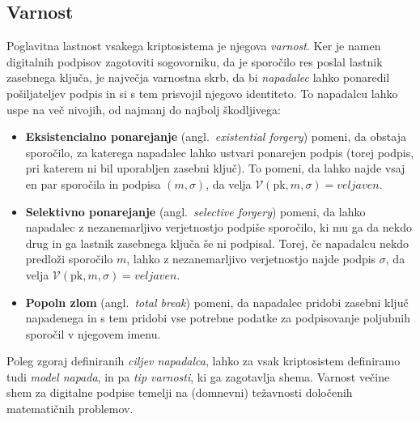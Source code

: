 \documentclass[isrm2, tisk]{fmfdelo}
\begin{document}
\subsection{Varnost}
Poglavitna lastnost vsakega kriptosistema je njegova \textit{varnost}. Ker je namen digitalnih podpisov
zagotoviti sogovorniku, da je sporočilo res poslal lastnik zasebnega ključa, je največja varnostna
skrb, da bi \textit{napadalec} lahko ponaredil pošiljateljev podpis in si s tem prisvojil njegovo 
identiteto. To napadalcu lahko uspe na več nivojih, od najmanj do najbolj škodljivega:

\begin{itemize}
    \item \textbf{Eksistencialno ponarejanje} (angl.\ \textit{existential forgery}) pomeni, da obstaja
        sporočilo, za katerega napadalec lahko ustvari ponarejen podpis (torej podpis, pri katerem
        ni bil uporabljen zasebni ključ). To pomeni, da lahko najde vsaj en par sporočila in podpisa
        $(m, \sigma)$, da velja $\mathcal{V}(\text{pk}, m, \sigma) = veljaven$.
    \item \textbf{Selektivno ponarejanje} (angl.\ \textit{selective forgery}) pomeni, da lahko napadalec 
        z nezanemarljivo verjetnostjo podpiše sporočilo, ki mu ga da nekdo drug in ga lastnik zasebnega
        ključa še ni podpisal. Torej, če napadalcu nekdo predloži sporočilo $m$, lahko z nezanemarljivo 
        verjetnostjo najde podpis $\sigma$, da velja $\mathcal{V}(\text{pk}, m, \sigma) = veljaven$.
    \item \textbf{Popoln zlom} (angl.\ \textit{total break}) pomeni, da napadalec pridobi 
        zasebni ključ napadenega in s tem pridobi vse potrebne podatke za podpisovanje poljubnih
        sporočil v njegovem imenu.
\end{itemize}

Poleg zgoraj definiranih \textit{ciljev napadalca}, lahko za vsak kriptosistem definiramo tudi
\textit{model napada}, in pa \textit{tip varnosti}, ki ga zagotavlja shema. Varnost večine shem za 
digitalne podpise temelji na (domnevni) težavnosti določenih matematičnih problemov.
\end{document}
